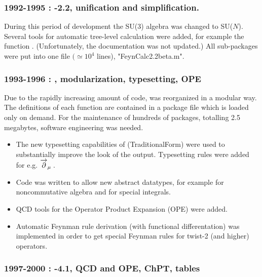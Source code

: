\subsubsection*{1992-1995 : -2.2, unification and simplification.}

During this period of development the SU(3) algebra was changed to SU($N$). Several tools for automatic tree-level calculation were added, for example the function . (Unfortunately, the  documentation was not updated.) All sub-packages were put into one file \(\big(\simeq {{10}^4}\) lines), "FeynCalc2.2beta.m".

\subsubsection*{1993-1996 : , modularization, typesetting, OPE}

Due to the rapidly increasing amount of code, \fc was reorganized in a modular way. The definitions of each function are contained in a package file which is loaded only on demand. For the maintenance of hundreds of packages, totalling 2.5 megabytes, software engineering was needed.

\begin{itemize}

\item The new typesetting capabilities of  (TraditionalForm) were used to substantially improve the look of the output. Typesetting rules were added for e.g. \({\overvar{\partial }{\rightarrow}}_{\mu } \multsp \).

\item Code was written to allow new abstract datatypes, for example for noncommutative algebra and for special integrals.

\item QCD tools for the Operator Product Expansion  (OPE)
were added.

\item Automatic Feynman rule derivation (with functional
differentation) was implemented in order to get special Feynman rules
for twist-2 (and higher) operators.

\end{itemize}

\subsubsection*{1997-2000 : -4.1, QCD and OPE, ChPT, tables}

